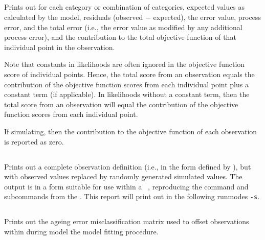 \subsection{}

Prints out for each category or combination of categories, expected values as calculated by the model, residuals (observed $-$ expected), the error value, process error, and the total error (i.e., the error value as modified by any additional process error), and the contribution to the total objective function of that individual point in the observation. 

Note that constants in likelihoods are often ignored in the objective function score of individual points. Hence, the total score from an observation equals the contribution of the objective function scores from each individual point plus a constant term (if applicable). In likelihoods without a constant term, then the total score from an observation will equal the contribution of the objective function scores from each individual point.

If simulating, then the contribution to the objective function of each observation is reported as zero. 

\subsection{}

Prints out a complete observation definition (i.e., in the form defined by ), but with observed values replaced by randomly generated simulated values. The output is in a form  suitable for use within a \CNAME\ \config, reproducing the command and subcommands from the \config. This report will print out in the following runmodes \texttt{-s}.

\subsection{}\label{sec:ageingerrorreport}

Prints out the ageing error misclassification matrix used to offset observations within during model the model fitting procedure.

\subsection{}


